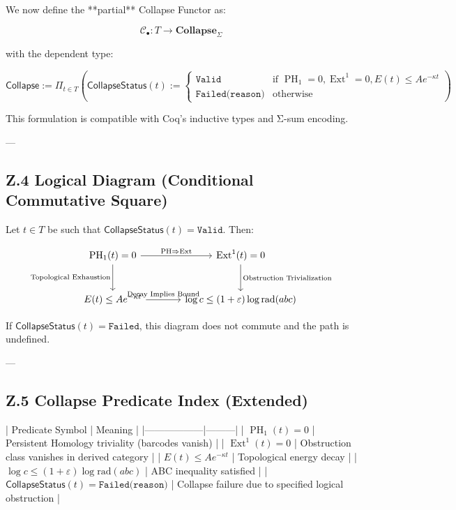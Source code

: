\documentclass[11pt]{article}
\DeclareMathOperator{\Ext}{Ext}
\DeclareMathOperator{\PH}{PH}
\begin{document}
We now define the **partial** Collapse Functor as:

\[
\mathcal{C}_\bullet : T \longrightarrow \mathbf{Collapse}_{\Sigma}
\]

with the dependent type:

\[
\mathsf{Collapse} := \Pi_{t \in T} \left(
  \mathsf{CollapseStatus}(t) := 
  \begin{cases}
    \texttt{Valid} & \text{if } \PH_1 = 0, \Ext^1 = 0, E(t) \leq Ae^{-\kappa t} \\
    \texttt{Failed(reason)} & \text{otherwise}
  \end{cases}
\right)
\]

This formulation is compatible with Coq's inductive types and Σ-sum encoding.

---

\subsection*{Z.4 Logical Diagram (Conditional Commutative Square)}

Let \( t \in T \) be such that \( \mathsf{CollapseStatus}(t) = \texttt{Valid} \). Then:

\[
\begin{tikzcd}[row sep=large, column sep=large]
\PH_1(t) = 0 \arrow[r, "\text{PH} \Rightarrow \Ext"] \arrow[d, swap, "\text{Topological Exhaustion}"]
& \Ext^1(t) = 0 \arrow[d, "\text{Obstruction Trivialization}"] \\
E(t) \leq Ae^{-\kappa t} \arrow[r, "\text{Decay Implies Bound}"]
& \log c \leq (1+\varepsilon)\log \mathrm{rad}(abc)
\end{tikzcd}
\]

If \( \mathsf{CollapseStatus}(t) = \texttt{Failed} \), this diagram does not commute and the path is undefined.

---

\subsection*{Z.5 Collapse Predicate Index (Extended)}

| Predicate Symbol | Meaning |
|------------------|---------|
| \( \PH_1(t) = 0 \) | Persistent Homology triviality (barcodes vanish) |
| \( \Ext^1(t) = 0 \) | Obstruction class vanishes in derived category |
| \( E(t) \leq Ae^{-\kappa t} \) | Topological energy decay |
| \( \log c \leq (1+\varepsilon)\log \mathrm{rad}(abc) \) | ABC inequality satisfied |
| \( \mathsf{CollapseStatus}(t) = \texttt{Failed(reason)} \) | Collapse failure due to specified logical obstruction |
\end{document}
